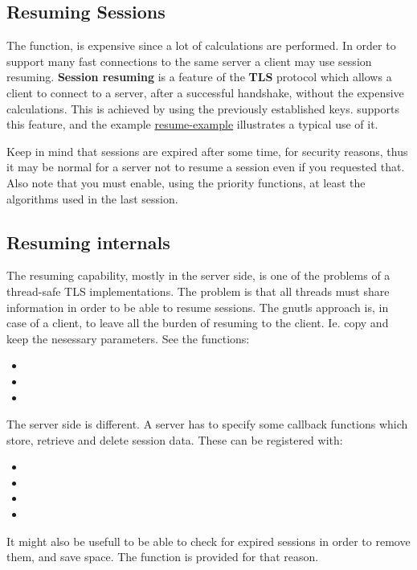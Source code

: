 \subsection{Resuming Sessions}
\par
The 
 function, is expensive since a lot of calculations are performed. In order to support many fast connections to
the same server a client may use session resuming. {\bf Session resuming} is a
feature of the {\bf TLS} protocol which allows a client to connect to a server,
after a successful handshake, without the expensive calculations. This is
achieved by using the previously
established keys. \gnutls{} supports this feature, and the
example \hyperref{resume client}{resume client (see section }{)}{resume-example} illustrates a typical use of it.
\par
Keep in mind that sessions are expired after some time, for security reasons, thus
it may be normal for a server not to resume a session even if you requested that.
Also note that you must enable, using the priority functions, at least the
algorithms used in the last session.

\subsection{Resuming internals}
The resuming capability, mostly in the server side, is one of the problems of a thread-safe TLS
implementations. The problem is that all threads must share information in
order to be able to resume sessions. The gnutls approach is, in case of a
client, to leave all the burden of resuming to the client. Ie. copy and keep the
nesessary parameters. See the functions:
\begin{itemize}
\item {}
\item {}
\item {}
\end{itemize}

\par
The server side is different. A server has to specify some callback functions
which store, retrieve and delete session data. These can be registered with:
\begin{itemize}
\item {}
\item {}
\item {}
\item {}
\end{itemize}

\par
It might also be usefull to be able to check for expired sessions in order to remove 
them, and save space. The function
 is provided for that
reason.

